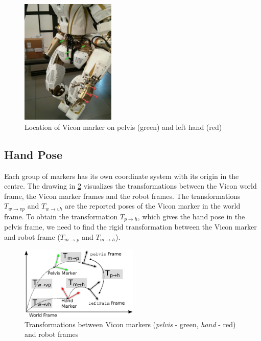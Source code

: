 \begin{figure}
\captionsetup{width=0.4\textwidth}
\centering
\includegraphics[width=0.4\textwidth]{images/vicon_pose/vicon_marker_col.jpg}
\caption{Location of Vicon marker on pelvis (green) and left hand (red)}
\label{fig:vicon_marker}
\end{figure}


\subsection{Hand Pose}

Each group of markers has its own coordinate system with its origin in the centre.
The drawing in \cref{fig:transform_vicon_robot} visualizes the transformations between the Vicon world frame, the Vicon marker frames and the robot frames.
The transformations $T_{w \rightarrow vp}$ and $T_{w \rightarrow vh}$ are the reported poses of the Vicon marker in the world frame.
To obtain the transformation $T_{p \rightarrow h}$, which gives the hand pose in the pelvis frame, we need to find the rigid transformation between the Vicon marker and robot frame ($T_{m \rightarrow p}$ and $T_{m \rightarrow h}$).

\begin{figure}
\captionsetup{width=0.52\textwidth}
\centering
\includegraphics[width=0.5\textwidth]{images/vicon_pose/vicon_transforms.pdf}
\caption{Transformations between Vicon markers (\textit{pelvis} - green, \textit{hand} - red) and robot frames}
\label{fig:transform_vicon_robot}
\end{figure}

